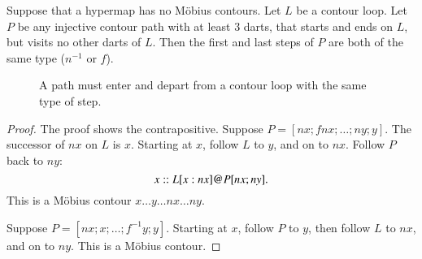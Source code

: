 \begin{lemma}
Suppose that a hypermap has no M\"obius contours. Let $L$ be a
contour loop.  Let $P$ be any injective contour path with at least
$3$ darts, that starts and ends on $L$, but visits no other darts of
$L$.  Then the first and last steps of $P$ are both of the same type
($n^{-1}$ or $f$).
\end{lemma}
%

\begin{figure}[htb]
\centering
{}
\caption{A path must enter and depart from a contour loop with the
same type of step.}
\label{fig:interior_nf}
\end{figure}


\begin{proof} The proof shows the contrapositive.  Suppose $P=[n x;f n
x;\ldots;n y;y]$.  The successor of $n x$ on $L$ is $x$.  Starting
at $x$, follow $L$ to $y$, and on to $n x$.  Follow $P$ back to $n
y$:
\begin{displaymath}
x::L[x:n x] {{\operatorname{@}}} P[ n x;ny].
\end{displaymath}  
This is a M\"obius contour $x\ldots y\ldots n x\ldots n y$.

Suppose $P=[n x;x;\ldots;f^{-1} y;y]$.  Starting at $x$, follow $P$ to
$y$, then follow $L$ to $n x$, and on to $n y$.  This is a M\"obius
contour.
\end{proof}


%



